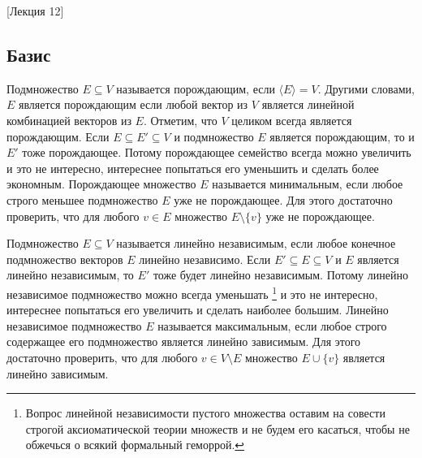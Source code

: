 [Лекция 12]


\subsection{Базис}

Подмножество $E\subseteq V$ называется порождающим, если $\langle E \rangle  = V$.
Другими словами, $E$ является порождающим если любой вектор из $V$ является линейной комбинацией векторов из $E$.
Отметим, что $V$ целиком всегда является порождающим.
Если $E\subseteq E'\subseteq V$ и подмножество $E$ является порождающим, то и $E'$ тоже порождающее.
Потому порождающее семейство всегда можно увеличить и это не интересно, интереснее попытаться его уменьшить и сделать более экономным.
Порождающее множество $E$ называется минимальным, если любое строго меньшее подмножество $E$ уже не порождающее.
Для этого достаточно проверить, что для любого $v\in E$ множество $E\setminus \{v\}$ уже не порождающее.

Подмножество $E\subseteq V$ называется линейно независимым, если любое конечное подмножество векторов $E$ линейно независимо.
Если $E'\subseteq E\subseteq V$ и $E$ является линейно независимым, то $E'$ тоже будет линейно независимым.
Потому линейно независимое подмножество можно всегда уменьшать%
\footnote{Вопрос линейной независимости пустого множества оставим на совести строгой аксиоматической теории множеств и не будем его касаться, чтобы не обжечься о всякий формальный геморрой.}
и это не интересно, интереснее попытаться его увеличить и сделать наиболее большим.
Линейно независимое подмножество $E$ называется максимальным, если любое строго содержащее его подмножество является линейно зависимым.
Для этого достаточно проверить, что для любого $v\in V\setminus E$ множество $E\cup \{v\}$ является линейно зависимым.

